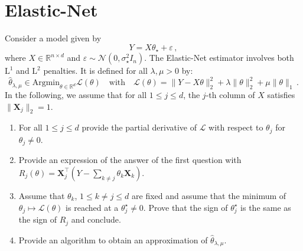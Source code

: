 \documentclass[a4paper,10pt,fleqn]{article}
\newcommand{\1}{\ensuremath{\mathbbm{1}}}
\begin{document}
\section{Elastic-Net}
Consider a model given by 
$$
Y = X\theta_\star + \varepsilon\,,
$$
where $X\in\mathbb{R}^{n\times d}$ and $\varepsilon \sim \mathcal{N}(0,\sigma_\star^2I_n)$. The Elastic-Net estimator involves both $\mathrm{L}^1$ and $\mathrm{L}^2$ penalties. It is defined for all $\lambda,\mu>0$ by:
$$
\widehat{\theta}_{\lambda,\mu}\in\mathrm{Argmin}_{\theta\in\mathbb{R}^d} \mathcal{L}(\theta)\quad\mathrm{with} \quad \mathcal{L}(\theta) = \|Y-X\theta\|_2^2 + \lambda \|\theta\|_2^2 + \mu \|\theta\|_1\,.
 $$
In the following, we assume that for all $1\leq j\leq d$, the $j$-th column of $X$ satisfies $\|\mathbf{X}_j\|_2 = 1$.
\begin{enumerate}
\item For all $1\leq j \leq d$ provide the partial derivative of $\mathcal{L}$ with respect to $\theta_j$ for $\theta_j\neq 0$. 
\item Provide an expression of the answer of the first question with $R_j(\theta) = \mathbf{X}_j^\top(Y - \sum_{k\neq j}\theta_k\mathbf{X}_k)$.
\item Assume that $\theta_k$, $1\leq k\neq j \leq d$ are fixed and assume that the minimum of $\theta_j \mapsto \mathcal{L}(\theta)$ is reached at a $\theta^\star_j\neq 0$. Prove that the sign of $\theta^\star_j$ is the same as the sign of $R_j$ and conclude.
\item Provide an algorithm to obtain an approximation of $\widehat{\theta}_{\lambda,\mu}$.
\end{enumerate}
\end{document}

